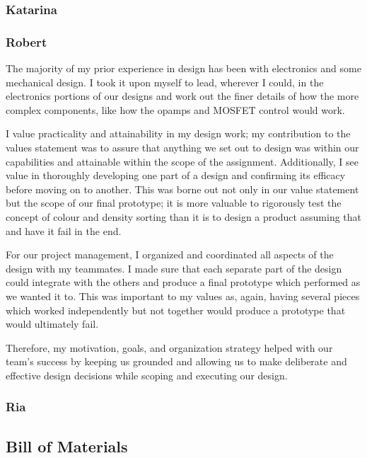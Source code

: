 \documentclass[12pt]{article}
\begin{document}
\begin{multicols*}{2}
            \subsubsection{Katarina}

            \subsubsection{Robert}
                The majority of my prior experience in design has been with electronics and some mechanical design. I took it upon myself to lead, wherever I could, in the electronics portions of our designs and work out the finer details of how the more complex components, like how the opamps and MOSFET control would work.

                I value practicality and attainability in my design work; my contribution to the values statement was to assure that anything we set out to design was within our capabilities and attainable within the scope of the assignment. Additionally, I see value in thoroughly developing one part of a design and confirming its efficacy before moving on to another. This was borne out not only in our value statement but the scope of our final prototype; it is more valuable to rigorously test the concept of colour and density sorting than it is to design a product assuming that and have it fail in the end. 

                For our project management, I organized and coordinated all aspects of the design with my teammates. I made sure that each separate part of the design could integrate with the others and produce a final prototype which performed as we wanted it to. This was important to my values as, again, having several pieces which worked independently but not together would produce a prototype that would ultimately fail. 

                Therefore, my motivation, goals, and organization strategy helped with our team's success by keeping us grounded and allowing us to make deliberate and effective design decisions while scoping and executing our design.


            \subsubsection{Ria}

            
        \subsection{Bill of Materials}


\end{multicols*}
\end{document}
